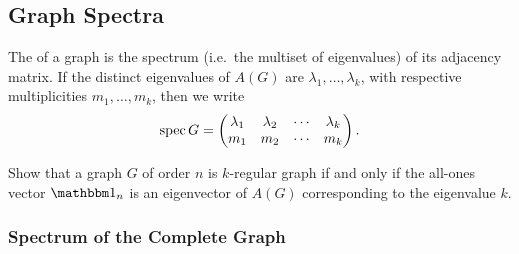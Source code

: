 %
%

\subsection{Graph Spectra}\label{subsec:Spectra}

The  of a graph is the spectrum (i.e.\ the multiset of eigenvalues) of its adjacency matrix. If the distinct eigenvalues of $A(G)$ are $\lambda_1, \ldots, \lambda_k$, with respective multiplicities $m_1, \ldots, m_k$, then we write
\begin{equation*}
\operatorname{spec} G = \begin{pmatrix}
\lambda_1 & \lambda_2 & \cdots & \lambda_k \\
m_1 & m_2 & \cdots & m_k
\end{pmatrix}.
\end{equation*}

\begin{Exercise}
Show that a graph $G$ of order $n$ is $k$-regular graph if and only if the all-ones vector $\mathbbm 1_n$ is an eigenvector of $A(G)$ corresponding to the eigenvalue $k$.
\end{Exercise}

\subsubsection*{Spectrum of the Complete Graph}\label{subsubsec:KnSpectrum}

